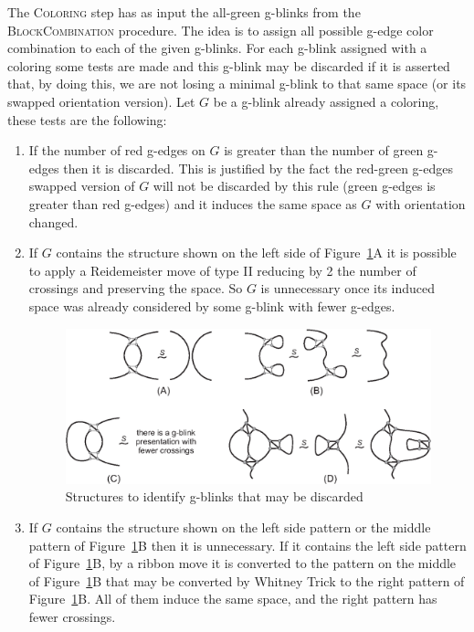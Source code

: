 The \textsc{Coloring} step has as input the  all-green
g-blinks from the \textsc{BlockCombination} procedure.
The idea is to assign all possible g-edge color combination
to each of the given g-blinks. For each g-blink assigned
with a coloring some tests are made and this g-blink may
be discarded if it is asserted that, by doing this, we are
not losing a minimal g-blink to that same space (or its swapped
orientation version). Let $G$ be a g-blink already assigned
a coloring, these tests are the following:
\begin{enumerate}
\item If the number of red g-edges on $G$ is greater than the
number of green g-edges then it is discarded. This is
justified by the fact the red-green g-edges swapped version of $G$
will not be discarded by this rule (green g-edges is greater than
red g-edges) and it induces the same space as $G$ with orientation
changed.

\item If $G$ contains the structure shown
on the left side of Figure~\ref{fig:unecessaryGBlinkStructure}A it
is possible to apply a Reidemeister move of type II reducing by 2
the number of crossings and preserving the space. So $G$ is
unnecessary once its induced space was already considered by some
g-blink with fewer g-edges.

\begin{figure}[htp]
   \begin{center}
      \leavevmode
      \includegraphics[width=12cm]{fig/unnecessaryGBlinkStructure.eps}
   \end{center}
   \vspace{-0.7cm}
   \caption{ Structures to identify g-blinks that may be discarded}
   \label{fig:unecessaryGBlinkStructure}
\end{figure}

\item If $G$ contains the structure shown
on the left side pattern or the middle pattern of
Figure~\ref{fig:unecessaryGBlinkStructure}B then it is unnecessary.
If it contains the left side pattern of
Figure~\ref{fig:unecessaryGBlinkStructure}B, by a ribbon move it is
converted to the pattern on the middle of
Figure~\ref{fig:unecessaryGBlinkStructure}B that may be converted by
Whitney Trick to the right pattern of
Figure~\ref{fig:unecessaryGBlinkStructure}B. All of them induce the
same space, and the right pattern has fewer crossings.


\end{enumerate}

